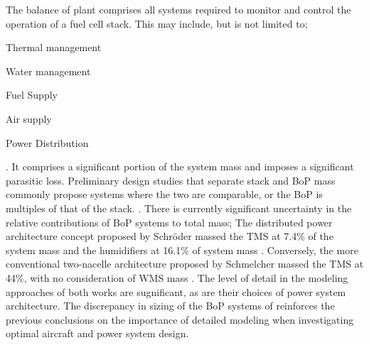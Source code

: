 The balance of plant comprises all systems required to monitor and control the operation of a fuel cell stack. This may include, but is not limited to; \begin{enumerate*}
	\item Thermal management
	\item Water management
	\item Fuel Supply
	\item Air supply
	\item Power Distribution
\end{enumerate*}. It comprises a significant portion of the system mass and imposes a significant parasitic loss. Preliminary design studies that separate stack and BoP mass commonly propose systems where the two are comparable, or the BoP is multiples of that of the stack. \cite{schroderOptimalDesignProton2024, parkRefinedSizingMethod2022, schmelcherHydrogenFuelCells2022a}.
There is currently significant uncertainty in the relative contributions of BoP systems to total mass;
The distributed power architecture concept proposed by Schr\"oder \etal massed the TMS at 7.4\% of the system mass and the humidifiers at 16.1\% of system mass \cite{schroderOptimalDesignProton2024}.
Conversely, the more conventional two-nacelle architecture proposed by Schmelcher massed the TMS at 44\%, with no consideration of WMS mass \cite{schmelcherHydrogenFuelCells2022a}.
The level of detail in the modeling approaches of both works are sugnificant, as are their choices of power system architecture.
The discrepancy in sizing of the BoP systems of reinforces the previous conclusions on the importance of detailed modeling when investigating optimal aircraft and power system design.
